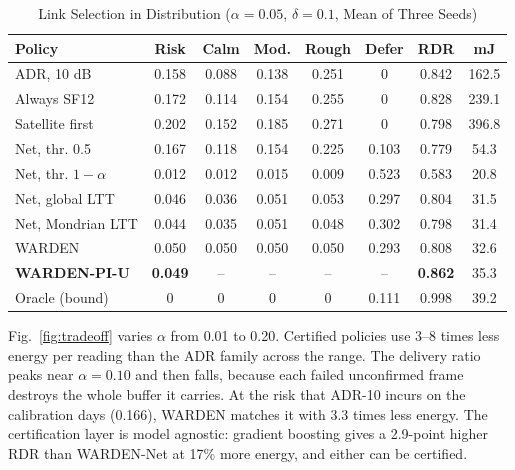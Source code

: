 \documentclass[journal]{IEEEtran}\def\WARDENieee{1}%
\begin{document}
\begin{table}[!t]
\caption{Link Selection in Distribution ($\alpha=0.05$, $\delta=0.1$, Mean of Three Seeds)}\label{tab:main}
\centering\scriptsize\setlength{\tabcolsep}{2.4pt}
\begin{tabular}{@{}lccccccc@{}}
\toprule
Policy & Risk & Calm & Mod. & Rough & Defer & RDR & mJ\\\midrule
ADR, 10 dB & 0.158 & 0.088 & 0.138 & 0.251 & 0 & 0.842 & 162.5\\
Always SF12 & 0.172 & 0.114 & 0.154 & 0.255 & 0 & 0.828 & 239.1\\
Satellite first & 0.202 & 0.152 & 0.185 & 0.271 & 0 & 0.798 & 396.8\\
Net, thr. 0.5 & 0.167 & 0.118 & 0.154 & 0.225 & 0.103 & 0.779 & 54.3\\
Net, thr. $1-\alpha$ & 0.012 & 0.012 & 0.015 & 0.009 & 0.523 & 0.583 & 20.8\\
Net, global LTT & 0.046 & 0.036 & 0.051 & 0.053 & 0.297 & 0.804 & 31.5\\
Net, Mondrian LTT & 0.044 & 0.035 & 0.051 & 0.048 & 0.302 & 0.798 & 31.4\\
WARDEN & 0.050 & 0.050 & 0.050 & 0.050 & 0.293 & 0.808 & 32.6\\
\textbf{WARDEN-PI-U} & \textbf{0.049} & -- & -- & -- & -- & \textbf{0.862} & 35.3\\
Oracle (bound) & 0 & 0 & 0 & 0 & 0.111 & 0.998 & 39.2\\
\bottomrule
\end{tabular}
\end{table}

Fig.~\ref{fig:tradeoff} varies $\alpha$ from 0.01 to 0.20. Certified policies use 3--8 times less energy per reading than the ADR family across the range. The delivery ratio peaks near $\alpha=0.10$ and then falls, because each failed unconfirmed frame destroys the whole buffer it carries. At the risk that ADR-10 incurs on the calibration days (0.166), WARDEN matches it with 3.3 times less energy. The certification layer is model agnostic: gradient boosting gives a 2.9-point higher RDR than WARDEN-Net at 17\% more energy, and either can be certified.
\end{document}
